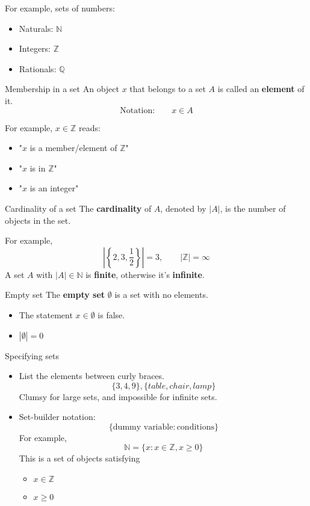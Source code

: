 \documentclass{beamer}
\begin{document}
\begin{frame}
For example, sets of numbers:
\begin{itemize}
\item Naturals: $\mathbb{N}$\pause
\item Integers: $\mathbb{Z}$\pause
\item Rationals: $\mathbb{Q}$
\end{itemize}\pause

\begin{block}{Membership in a set}
An object $x$ that belongs to a set $A$ is called an \textbf{element} of it.
\[
\textrm{Notation:}\qquad x\in A
\]
\end{block}
For example, $x\in\mathbb{Z}$ reads:
\begin{itemize}
\item "$x$ is a member/element of $\mathbb{Z}$"\pause
\item "$x$ is in $\mathbb{Z}$"\pause
\item "$x$ is an integer"
\end{itemize}
\end{frame}

\begin{frame}
\begin{block}{Cardinality of a set}
The \textbf{cardinality} of $A$, denoted by $|A|$, is the number of objects in the set.
\end{block}\pause
For example,
\[
\left|\left\{2,3,\frac{1}{2}\right\}\right|=3,\qquad |\mathbb{Z}|=\infty
\]\pause
A set $A$ with $|A|\in\mathbb{N}$ is \textbf{finite}, otherwise it's \textbf{infinite}.
\begin{block}{Empty set}
The \textbf{empty set} $\emptyset$ is a set with no elements.
\end{block}\pause
\begin{itemize}
\item The statement $x\in\emptyset$ is false.\pause
\item $|\emptyset|=0$
\end{itemize}
\end{frame}

\begin{frame}{Specifying sets}
\begin{itemize}
\item List the elements between curly braces.
\[
\{3,4,9\}, \{table, chair, lamp\}
\]\pause
Clumsy for large sets, and impossible for infinite sets.\pause
\item Set-builder notation:
\[
\{\textrm{dummy variable}: \textrm{conditions}\}
\]\pause
For example,
\[
\mathbb{N}=\{x: x\in\mathbb{Z}, x\geq 0\}
\]
This is a set of objects satisfying
\begin{itemize}
\item $x\in\mathbb{Z}$
\item $x\geq 0$
\end{itemize}
\end{itemize}
\end{frame}
\end{document}
